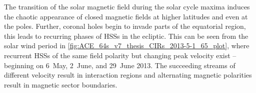 The transition of the solar magnetic field during the solar cycle maxima induces the chaotic appearance of closed magnetic fields at higher latitudes and even at the poles. Further, coronal holes begin to invade parts of the equatorial region, this leads to recurring phases of HSSs in the ecliptic. This can be seen from the solar wind period in \autoref{fig:ACE_64s_v7_thesis_CIRs_2013-5-1_65_plot}, where recurrent HSSs of the same field polarity but changing peak velocity exist -- beginning on 6~May, 2~June, and 29~June 2013. The succeeding streams of different velocity result in interaction regions and alternating magnetic polarities result in magnetic sector boundaries.


